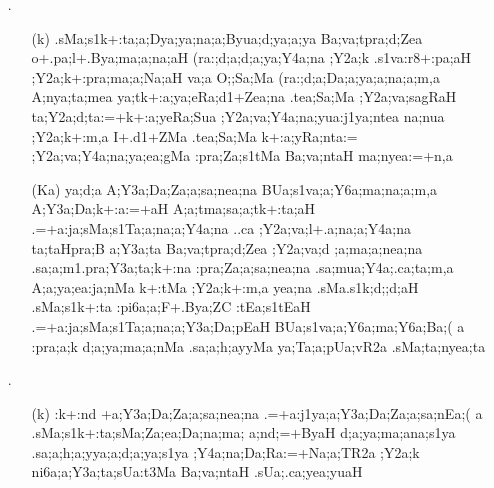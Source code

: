 \begin{itemize}                 
  \item[{\sktf 31}.] \begin{itemize}
                 
                 \item[({\sktf k})] {\sktf .sMa;s1k+:ta;a;Dya;ya;na;a;Byua;d;ya;a;ya Ba;va;tpra;d;Zea
o+.pa;l+.Bya;ma;a;na;aH (ra:;d;a;d;a;ya;Y4a;na} {\sktf ;Y2a;k .s1va:r8+:pa;aH
;Y2a;k+:pra;ma;a;Na;aH va;a O;;Sa;Ma
(ra:;d;a;Da;a;ya;a;na;a;m,a A;nya;ta;mea\ZF{,}
ya;tk+:a;ya;eRa;d1+Zea;na .tea;Sa;Ma ;Y2a;va;sagRaH\ZF{,} ta;Y2a;d;ta:=+k+:a;yeRa;Sua ;Y2a;va;Y4a;na;yua:j1ya;ntea
na;nua ;Y2a;k+:m,a I+.d1+ZMa .tea;Sa;Ma
k+:a;yRa;nta:= ;Y2a;va;Y4a;na;ya;ea;gMa :pra;Za;s1tMa
Ba;va;ntaH ma;nyea:=+n,a}
                 
                 \item[({\sktf Ka})] {\sktf ya;d;a A;Y3a;Da;Za;a;sa;nea;na
BUa;s1va;a;Y6a;ma;na;a;m,a A;Y3a;Da;k+:a:=+aH
A;a;tma;sa;a;tk+:ta;aH\ZF{,}
.=+a:ja;sMa;s1Ta;a;na;a;Y4a;na ..ca ;Y2a;va;l+.a;na;a;Y4a;na\ZF{,} ta;taHpra;B%
a;Y3a;ta Ba;va;tpra;d;Zea ;Y2a;va;d%
;a;ma;a;nea;na .sa;a;m1.pra;Y3a;ta;k+:na
:pra;Za;a;sa;nea;na .sa;mua;Y4a;.ca;ta;m,a A;a;ya;ea:ja;nMa
k+:tMa ;Y2a;k+:m,a\ZF{,} yea;na {.sMa}.s1k;d;;d;aH
.sMa;s1k+:ta :pi6a;a;F+.Bya;ZC :tEa;s1tEaH
.=+a:ja;sMa;s1Ta;a;na;a;Y3a;Da;pEaH BUa;s1va;a;Y6a;ma;Y6a;Ba;(%
a :pra;a;k d;a;ya;ma;a;nMa .sa;a;h;a{yyMa} {ya};Ta;a;pUa;vR2a .sMa;ta;nyea;ta }
  
                \end{itemize} 
                
\item[{\sktf 32}.] \begin{itemize}
               
               \item[({\sktf k})] {\sktf :k+:nd%
+a;Y3a;Da;Za;a;sa;nea;na .=+a:j1ya;a;Y3a;Da;Za;a;sa;nEa;(%
a .sMa;s1k+:ta;sMa;Za;ea;Da;na;ma;%
a;nd;=+ByaH d;a;ya{;ma;a}na{;s1ya} .sa;a;h;a;yya;a;d;a;ya;s1ya ;Y4a;na;Da;Ra:=+Na;a;TR2a
;Y2a;k ni6a;a;Y3a;ta;sUa:t3Ma Ba;va;ntaH
.sUa;.ca;yea;yuaH}  
                

\end{itemize}
\end{itemize}
